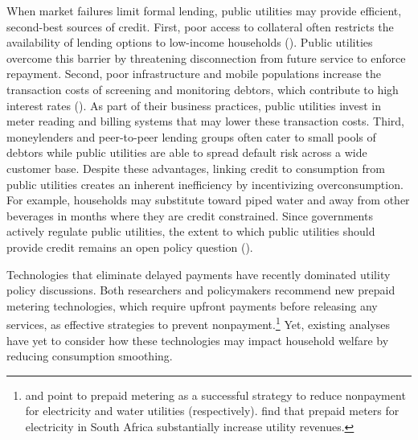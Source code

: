 \documentclass[12pt,table]{article}
\begin{document}
When market failures limit formal lending, public utilities may provide efficient, second-best sources of credit.  First, poor access to collateral often restricts the availability of  lending options to low-income households (\cite{jack2016borrowing}).  Public utilities overcome this barrier by threatening disconnection from future service to enforce repayment.  Second, poor infrastructure and mobile populations increase the transaction costs of screening and monitoring debtors, which contribute to high interest rates (\cite{jack2014risk}).  As part of their business practices, public utilities invest in meter reading and billing systems that may lower these transaction costs.  Third, moneylenders and peer-to-peer lending groups often cater to small pools of debtors while public utilities are able to spread default risk across a wide customer base.  Despite these advantages, linking credit to consumption from public utilities creates an inherent inefficiency by incentivizing overconsumption.  For example, households may substitute toward piped water and away from other beverages in months where they are credit constrained.  Since governments actively regulate public utilities, the extent to which public utilities should provide credit remains an open policy question (\cite{laffont2005regulation}).  

Technologies that eliminate delayed payments have recently dominated utility policy discussions.    Both researchers and policymakers recommend new prepaid metering technologies, which require upfront payments before releasing any services, as effective strategies to prevent nonpayment.\footnote{\cite{kojima2016making} and \cite{heymans2014limits} point to prepaid metering as a successful strategy to reduce nonpayment for electricity and water utilities (respectively).  \cite{jack2016charging} find that prepaid meters for electricity in South Africa substantially increase utility revenues.}    Yet, existing analyses have yet to consider how these technologies may impact household welfare by reducing consumption smoothing.
\end{document}
